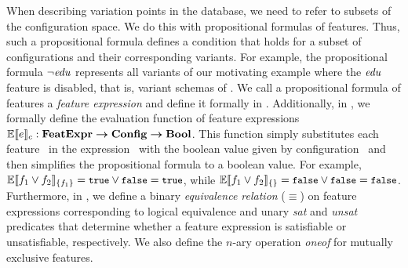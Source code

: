 When describing variation points in the database, we need to 
refer to subsets of the configuration space. We do this with
propositional formulas of features.
Thus, 
such a propositional formula defines a condition that holds for 
a subset of configurations and their corresponding variants. 
%
%
For example, the propositional formula $\neg \edu$ represents all variants of
our motivating example where the $\edu$ feature is disabled, that is, variant
schemas of . 
%
We call a propositional formula of features a \emph{feature expression} and define
it formally in . 
Additionally, in , we formally define the evaluation function of feature expressions
$\fSem \dimMeta : \ffSet \totype \confSet \totype \bSet$. This function simply substitutes each
feature \fName\ in the expression \dimMeta\ with the boolean value 
given by configuration \config\ and then
simplifies the propositional formula to a boolean value.
For example, 
$\fSem [\{\A\}] {\A \vee \B} = \t \vee \f = \t$, while
$\fSem [\{\}] {\A \vee \B} = \f \vee \f = \f$.
Furthermore, in , we define a binary \emph{equivalence
relation} ($\equiv$)  on feature expressions corresponding to logical
equivalence and unary \emph{sat} and \emph{unsat} predicates that determine
whether a feature expression is satisfiable or unsatisfiable, respectively.
We also define the $\mathit{n}$-ary operation \emph{oneof} for mutually exclusive features.
